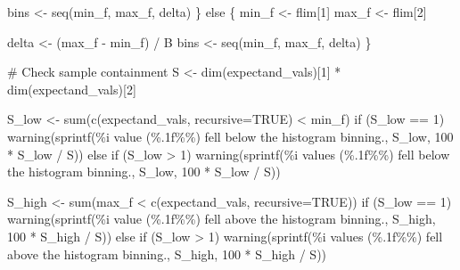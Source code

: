 \documentclass[
  letterpaper,
  DIV=11,
  numbers=noendperiod]{scrartcl}
\newenvironment{Shaded}{\begin{snugshade}}{\end{snugshade}}
\newcommand{\BuiltInTok}[1]{\textcolor[rgb]{0.00,0.23,0.31}{#1}}
\newcommand{\CommentTok}[1]{\textcolor[rgb]{0.37,0.37,0.37}{#1}}
\newcommand{\ControlFlowTok}[1]{\textcolor[rgb]{0.00,0.23,0.31}{#1}}
\newcommand{\DecValTok}[1]{\textcolor[rgb]{0.68,0.00,0.00}{#1}}
\newcommand{\NormalTok}[1]{\textcolor[rgb]{0.00,0.23,0.31}{#1}}
\newcommand{\OperatorTok}[1]{\textcolor[rgb]{0.37,0.37,0.37}{#1}}
\newcommand{\SpecialCharTok}[1]{\textcolor[rgb]{0.37,0.37,0.37}{#1}}
\newcommand{\StringTok}[1]{\textcolor[rgb]{0.13,0.47,0.30}{#1}}
\begin{document}
\begin{Shaded}
\begin{Highlighting}[]
\NormalTok{    bins }\OperatorTok{\textless{}{-}}\NormalTok{ seq(min\_f, max\_f, delta)}
\NormalTok{  \} }\ControlFlowTok{else}\NormalTok{ \{}
\NormalTok{    min\_f }\OperatorTok{\textless{}{-}}\NormalTok{ flim[}\DecValTok{1}\NormalTok{]}
\NormalTok{    max\_f }\OperatorTok{\textless{}{-}}\NormalTok{ flim[}\DecValTok{2}\NormalTok{]}
    
\NormalTok{    delta }\OperatorTok{\textless{}{-}}\NormalTok{ (max\_f }\OperatorTok{{-}}\NormalTok{ min\_f) }\OperatorTok{/}\NormalTok{ B}
\NormalTok{    bins }\OperatorTok{\textless{}{-}}\NormalTok{ seq(min\_f, max\_f, delta)}
\NormalTok{  \}}
  
  \CommentTok{\# Check sample containment}
\NormalTok{  S }\OperatorTok{\textless{}{-}}\NormalTok{ dim(expectand\_vals)[}\DecValTok{1}\NormalTok{] }\OperatorTok{*}\NormalTok{ dim(expectand\_vals)[}\DecValTok{2}\NormalTok{]}
  
\NormalTok{  S\_low }\OperatorTok{\textless{}{-}} \BuiltInTok{sum}\NormalTok{(c(expectand\_vals, recursive}\OperatorTok{=}\NormalTok{TRUE) }\OperatorTok{\textless{}}\NormalTok{ min\_f)}
  \ControlFlowTok{if}\NormalTok{ (S\_low }\OperatorTok{==} \DecValTok{1}\NormalTok{)}
\NormalTok{    warning(sprintf(}\StringTok{\textquotesingle{}}\SpecialCharTok{\%i}\StringTok{ value (}\SpecialCharTok{\%.1f\%\%}\StringTok{) fell below the histogram binning.\textquotesingle{}}\NormalTok{,}
\NormalTok{                    S\_low, }\DecValTok{100} \OperatorTok{*}\NormalTok{ S\_low }\OperatorTok{/}\NormalTok{ S))}
  \ControlFlowTok{else} \ControlFlowTok{if}\NormalTok{ (S\_low }\OperatorTok{\textgreater{}} \DecValTok{1}\NormalTok{)}
\NormalTok{    warning(sprintf(}\StringTok{\textquotesingle{}}\SpecialCharTok{\%i}\StringTok{ values (}\SpecialCharTok{\%.1f\%\%}\StringTok{) fell below the histogram binning.\textquotesingle{}}\NormalTok{,}
\NormalTok{                    S\_low, }\DecValTok{100} \OperatorTok{*}\NormalTok{ S\_low }\OperatorTok{/}\NormalTok{ S))}

\NormalTok{  S\_high }\OperatorTok{\textless{}{-}} \BuiltInTok{sum}\NormalTok{(max\_f }\OperatorTok{\textless{}}\NormalTok{ c(expectand\_vals, recursive}\OperatorTok{=}\NormalTok{TRUE))}
  \ControlFlowTok{if}\NormalTok{ (S\_low }\OperatorTok{==} \DecValTok{1}\NormalTok{)}
\NormalTok{    warning(sprintf(}\StringTok{\textquotesingle{}}\SpecialCharTok{\%i}\StringTok{ value (}\SpecialCharTok{\%.1f\%\%}\StringTok{) fell above the histogram binning.\textquotesingle{}}\NormalTok{,}
\NormalTok{                    S\_high, }\DecValTok{100} \OperatorTok{*}\NormalTok{ S\_high }\OperatorTok{/}\NormalTok{ S))}
  \ControlFlowTok{else} \ControlFlowTok{if}\NormalTok{ (S\_low }\OperatorTok{\textgreater{}} \DecValTok{1}\NormalTok{)}
\NormalTok{    warning(sprintf(}\StringTok{\textquotesingle{}}\SpecialCharTok{\%i}\StringTok{ values (}\SpecialCharTok{\%.1f\%\%}\StringTok{) fell above the histogram binning.\textquotesingle{}}\NormalTok{,}
\NormalTok{                    S\_high, }\DecValTok{100} \OperatorTok{*}\NormalTok{ S\_high }\OperatorTok{/}\NormalTok{ S))}


\end{Highlighting}
\end{Shaded}
\end{document}
